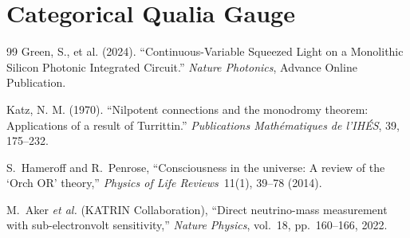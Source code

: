 \documentclass[12pt,oneside]{book}
\begin{document}
\chapter[Categorical Qualia]{Categorical Qualia Gauge}\label{ch:qualia}


\appendix


\vspace{2em}
\begin{thebibliography}{99}
Green, S., et al. (2024).
``Continuous-Variable Squeezed Light on a Monolithic Silicon Photonic Integrated Circuit.''
\textit{Nature Photonics}, Advance Online Publication.

Katz, N. M. (1970).
``Nilpotent connections and the monodromy theorem: Applications of a result of Turrittin.''
\textit{Publications Mathématiques de l'IHÉS}, 39, 175--232.

S.~Hameroff and R.~Penrose, ``Consciousness in the universe: A review of the `Orch OR' theory,'' \emph{Physics of Life Reviews}\ 11(1), 39--78 (2014).

M.~Aker \emph{et al.} (KATRIN Collaboration), ``Direct neutrino-mass measurement with sub-electronvolt sensitivity,'' \emph{Nature Physics}, vol.~18, pp.~160--166, 2022.

\end{thebibliography}
\end{document}
